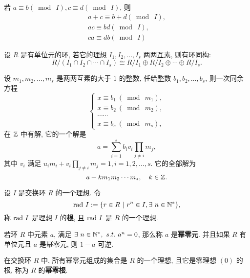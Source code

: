 \begin{property}
	若 $a\equiv b(\bmod\ I),c\equiv d(\bmod\ I)$, 则 $$
	\begin{array}{c}
		a+c\equiv b+d(\bmod\ I),\\
		ac\equiv bd(\bmod\ I),\\
		ca\equiv db(\bmod\ I)
	\end{array}
	$$
\end{property}

\begin{theorem}
	设 $R$ 是有单位元的环, 若它的理想 $I_1,I_2,\ldots,I_s$ 两两互素, 则有环同构: \begin{equation}
		R/(I_1\cap I_2\cap\cdots\cap I_s)\cong R/I_1\oplus R/I_2\oplus\cdots\oplus R/I_s.
	\end{equation}
\end{theorem}

\begin{theorem}[中国剩余定理]\label{中国剩余定理}
	设 $m_1,m_2,\ldots,m_s$ 是两两互素的大于 $1$ 的整数, 任给整数 $b_1,b_2,\ldots,b_s$, 则一次同余方程
	\begin{equation}
		\left\{
		\begin{array}{c}
			x\equiv b_1\ (\bmod\ m_1), \\
			x\equiv b_2\ (\bmod\ m_2), \\
			\cdots\cdots \\
			x\equiv b_s\ (\bmod\ m_s),
		\end{array}
		\right.
	\end{equation}
	在 $\mathbb Z$ 中有解, 它的一个解是 $$a=\sum\limits_{i=1}^s b_iv_i\prod\limits_{j\neq i}m_j,$$
	其中 $v_i$ 满足 $u_im_i+v_i\prod\limits_{j\neq i}m_j=1,i=1,2,\ldots,s$. 它的全部解为 $$a+km_1m_2\cdots m_s,\quad k\in\mathbb Z.$$
\end{theorem}

\begin{definition}\label{理想的根}
	设 $I$ 是交换环 $R$ 的一个理想. 令 $$\text {rad}\  I:=\{r\in R\ |\ r^n\in I,\exists\ n\in \mathbb N^*\},$$
	称 $\text {rad}\  I$ 是理想 $I$ 的\textbf{根}, 且 $\text {rad}\  I$ 是 $R$ 的一个理想.
\end{definition}

\begin{definition}\label{幂零元}
	若环 $R$ 中元素 $a$, 满足 $\exists\ n\in \N^*,\ s.t.\ a^n=0$, 那么称 $a$ 是\textbf{幂零元}.
	并且如果 $R$ 有单位元且 $a$ 是幂零元,  则 $1-a$ 可逆.
\end{definition}

\begin{definition}\label{幂零根}
	在交换环 $R$ 中, 所有幂零元组成的集合是 $R$ 的一个理想, 且它是零理想 $(0)$ 的根, 称为 $R$ 的\textbf{幂零根}.
\end{definition}

